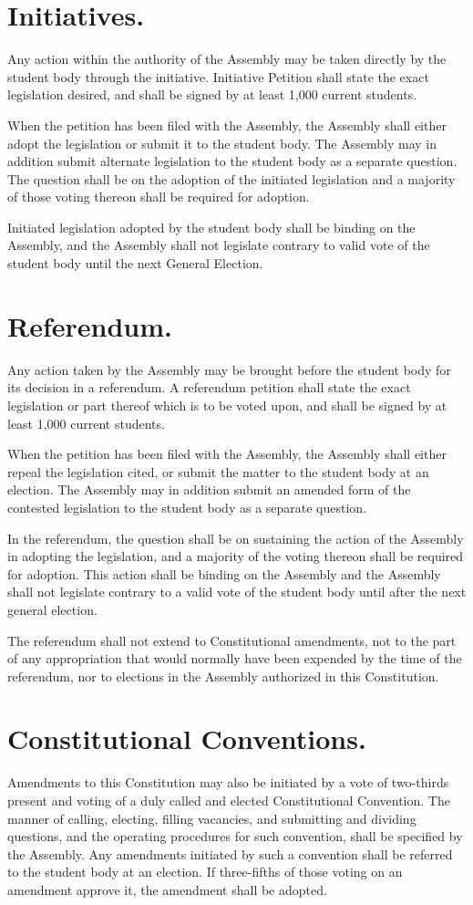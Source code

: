 \section{Initiatives.}
   Any action within the authority of the Assembly may be taken directly by the student body through the initiative. Initiative Petition shall state the exact legislation desired, and shall be signed by at least 1,000 current students.
   
   When the petition has been filed with the Assembly, the Assembly shall either adopt the legislation or submit it to the student body. The Assembly may in addition submit alternate legislation to the student body as a separate question. The question shall be on the adoption of the initiated legislation and a majority of those voting thereon shall be required for adoption.

   Initiated legislation adopted by the student body shall be binding on the Assembly, and the Assembly shall not legislate contrary to valid vote of the student body until the next General Election.


\section{Referendum.}
   Any action taken by the Assembly may be brought before the student body for its decision in a referendum. A referendum petition shall state the exact legislation or part thereof which is to be voted upon, and shall be signed by at least 1,000 current students.

   When the petition has been filed with the Assembly, the Assembly shall either repeal the legislation cited, or submit the matter to the student body at an election. The Assembly may in addition submit an amended form of the contested legislation to the student body as a separate question.

   In the referendum, the question shall be on sustaining the action of the Assembly in adopting the legislation, and a majority of the voting thereon shall be required for adoption. This action shall be binding on the Assembly and the Assembly shall not legislate contrary to a valid vote of the student body until after the next general election.

   The referendum shall not extend to Constitutional amendments, not to the part of any appropriation that would normally have been expended by the time of the referendum, nor to elections in the Assembly authorized in this Constitution.


\section{Constitutional Conventions.}
   Amendments to this Constitution may also be initiated by a vote of two-thirds present and voting of a duly called and elected Constitutional Convention. The manner of calling, electing, filling vacancies, and submitting and dividing questions, and the operating procedures for such convention, shall be specified by the Assembly. Any amendments initiated by such a convention shall be referred to the student body at an election. If three-fifths of those voting on an amendment approve it, the amendment shall be adopted.